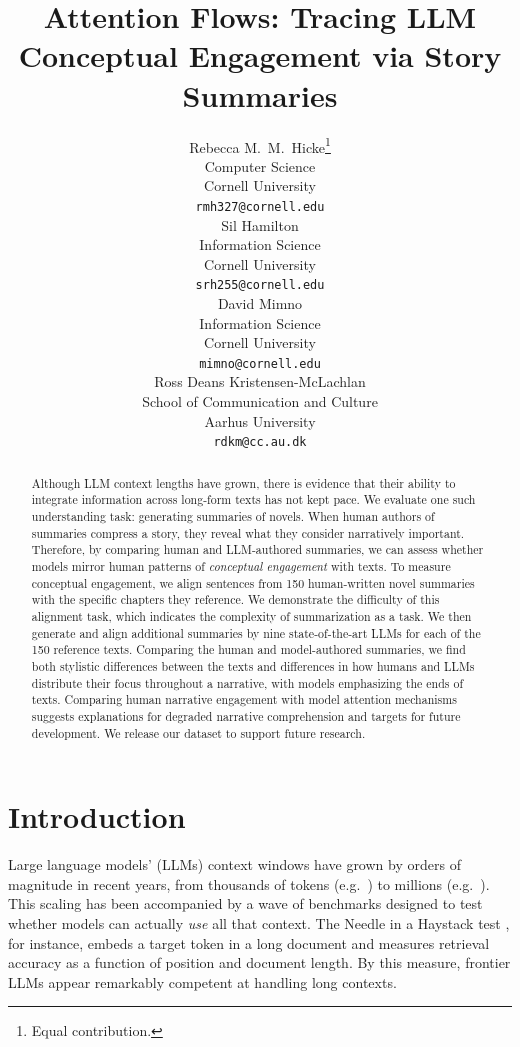 \documentclass{article} %
\title{Attention Flows: Tracing LLM Conceptual Engagement via Story Summaries}
\author{Rebecca M.\ M.\ Hicke\thanks{Equal contribution.} \\
Computer Science\\
Cornell University\\
\texttt{rmh327@cornell.edu} \\
\And
Sil Hamilton\footnotemark[1] \\
Information Science \\
Cornell University \\
\texttt{srh255@cornell.edu} \\
\And
David Mimno \\
Information Science \\
Cornell University \\
\texttt{mimno@cornell.edu} \\
\AND
\hspace*{0.3\textwidth}Ross Deans Kristensen-McLachlan \\
\hspace*{0.3\textwidth}School of Communication and Culture \\
\hspace*{0.3\textwidth}Aarhus University \\
\hspace*{0.3\textwidth}\texttt{rdkm@cc.au.dk} \\
}
\begin{document}
\maketitle

\begin{abstract}
Although LLM context lengths have grown, there is evidence that their ability to integrate information across long-form texts has not kept pace.
We evaluate one such understanding task: generating summaries of novels.
When human authors of summaries compress a story, they reveal what they consider narratively important.
Therefore, by comparing human and LLM-authored summaries, we can assess whether models mirror human patterns of \textit{conceptual engagement} with texts.
To measure conceptual engagement, we align sentences from 150 human-written novel summaries with the specific chapters they reference.
We demonstrate the difficulty of this alignment task, which indicates the complexity of summarization as a task.
We then generate and align additional summaries by nine state-of-the-art LLMs for each of the 150 reference texts.
Comparing the human and model-authored summaries, we find both stylistic differences between the texts and differences in how humans and LLMs distribute their focus throughout a narrative, with models emphasizing the ends of texts.
Comparing human narrative engagement with model attention mechanisms suggests explanations for degraded narrative comprehension and targets for future development.
We release our dataset to support future research.


\end{abstract}

\section{Introduction}

Large language models' (LLMs) context windows have grown by orders of magnitude in recent years, from thousands of tokens (e.g.\ \cite{radford2019language, devlin2019bert}) to millions (e.g.\ \cite{MetaAI2025Llama4, qwen3.5}). This scaling has been accompanied by a wave of benchmarks designed to test whether models can actually \textit{use} all that context. The Needle in a Haystack test \citep{li2025needlebench}, for instance, embeds a target token in a long document and measures retrieval accuracy as a function of position and document length. By this measure, frontier LLMs appear remarkably competent at handling long contexts.
\end{document}

